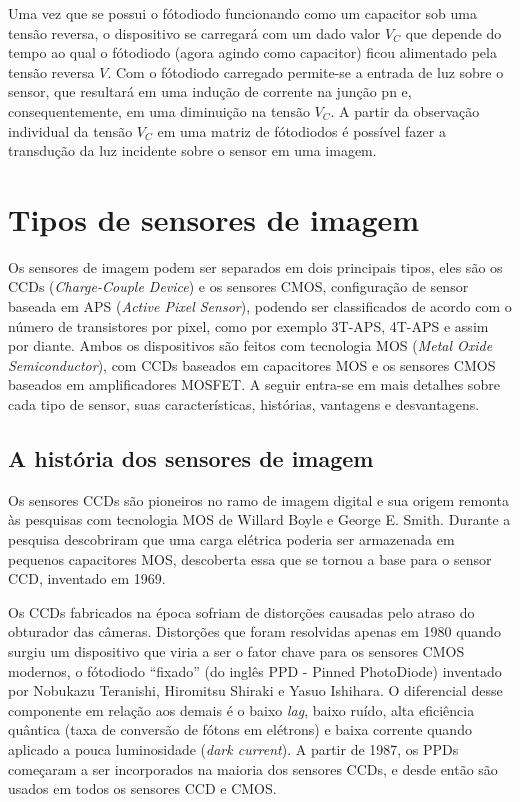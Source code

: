 \documentclass[10pt,a4paper,twocolumn]{article}
\begin{document}
		Uma vez que se possui o fótodiodo funcionando como um capacitor sob uma tensão reversa, o dispositivo se carregará com um dado valor $V_{C}$ que depende do tempo ao qual o fótodiodo (agora agindo como capacitor) ficou alimentado pela tensão reversa $V$. Com o fótodiodo carregado permite-se a entrada de luz sobre o sensor, que resultará em uma indução de corrente na junção pn e, consequentemente, em uma diminuição na tensão $V_{C}$. A partir da observação individual da tensão $V_{C}$ em uma matriz de fótodiodos é possível fazer a transdução da luz incidente sobre o sensor em uma imagem.
		
\section*{Tipos de sensores de imagem}
		Os sensores de imagem podem ser separados em dois principais tipos, eles são os CCDs (\textit{Charge-Couple Device}) e os sensores CMOS, configuração de sensor baseada em APS (\textit{Active Pixel Sensor}), podendo ser classificados de acordo com o número de transistores por pixel, como por exemplo 3T-APS, 4T-APS e assim por diante. Ambos os dispositivos são feitos com tecnologia MOS (\textit{Metal Oxide Semiconductor}), com CCDs baseados em capacitores MOS e os sensores CMOS baseados em amplificadores MOSFET. A seguir entra-se em mais detalhes sobre cada tipo de sensor, suas características, histórias, vantagens e desvantagens.
		
	\subsection*{A história dos sensores de imagem}
		Os sensores CCDs são pioneiros no ramo de imagem digital e sua origem remonta às pesquisas com tecnologia MOS de Willard Boyle e George E. Smith. Durante a pesquisa descobriram que uma carga elétrica poderia ser armazenada em pequenos capacitores MOS, descoberta essa que se tornou a base para o sensor CCD, inventado em 1969.
		
		Os CCDs fabricados na época sofriam de distorções causadas pelo atraso do obturador das câmeras. Distorções que foram resolvidas apenas em 1980 quando surgiu um dispositivo que viria a ser o fator chave para os sensores CMOS modernos, o fótodiodo ``fixado'' (do inglês PPD - Pinned PhotoDiode) inventado por Nobukazu Teranishi, Hiromitsu Shiraki e Yasuo Ishihara. O diferencial desse componente em relação aos demais é o baixo \textit{lag}, baixo ruído, alta eficiência quântica (taxa de conversão de fótons em elétrons) e baixa corrente quando aplicado a pouca luminosidade (\textit{dark current}). A partir de 1987, os PPDs começaram a ser incorporados na maioria dos sensores CCDs, e desde então são usados em todos os sensores CCD e CMOS.
		
\end{document}
